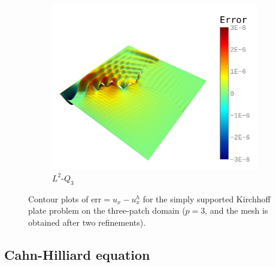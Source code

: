 \begin{figure}[ht]
\begin{subfigure}[t]{.45\linewidth}
		\center
		\includegraphics[scale=.4]{three_patch_plate_L2_contour}
		\caption{$L^2$-$Q_3$}
	\end{subfigure}
	\caption{Contour plots of $\text{err}=u_x-u_x^h$ for the simply supported Kirchhoff plate problem on the three-patch domain ($p=3$, and the mesh is obtained after two refinements). }\label{fig:contour_kirchhoff}
\end{figure}

\subsection{Cahn-Hilliard equation}

